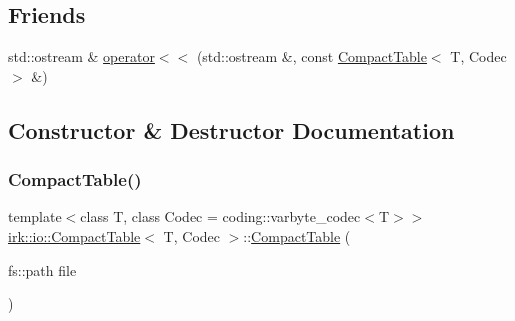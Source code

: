 \subsection*{Friends}
\begin{DoxyCompactItemize}
\item 
std\+::ostream \& \mbox{\hyperlink{classirk_1_1io_1_1CompactTable_aca625eae690396584a3998222ddd856f}{operator$<$$<$}} (std\+::ostream \&, const \mbox{\hyperlink{classirk_1_1io_1_1CompactTable}{Compact\+Table}}$<$ T, Codec $>$ \&)
\end{DoxyCompactItemize}


\subsection{Constructor \& Destructor Documentation}
\mbox{\label{classirk_1_1io_1_1CompactTable_a0b553fac209600eff4d053326e79db29}} 
\subsubsection{\texorpdfstring{Compact\+Table()}{CompactTable()}\hspace{0.1cm}{\footnotesize\ttfamily [1/2]}}
{\footnotesize\ttfamily template$<$class T, class Codec = coding\+::varbyte\+\_\+codec$<$\+T$>$$>$ \\
\mbox{\hyperlink{classirk_1_1io_1_1CompactTable}{irk\+::io\+::\+Compact\+Table}}$<$ T, Codec $>$\+::\mbox{\hyperlink{classirk_1_1io_1_1CompactTable}{Compact\+Table}} (\begin{DoxyParamCaption}\item[{fs\+::path}]{file }\end{DoxyParamCaption})\hspace{0.3cm}{\ttfamily [inline]}}

\mbox{\label{classirk_1_1io_1_1CompactTable_a902c0982ec971a8c49d39d8ab66c4d6c}} 
